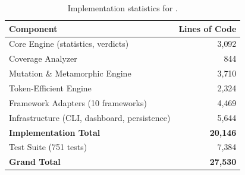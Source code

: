 \begin{table}[t]
\centering
\caption{Implementation statistics for \agentassay{}.}
\label{tab:impl-stats}
\small
\begin{tabular}{lr}
\toprule
\textbf{Component} & \textbf{Lines of Code} \\
\midrule
Core Engine (statistics, verdicts) & 3{,}092 \\
Coverage Analyzer & 844 \\
Mutation \& Metamorphic Engine & 3{,}710 \\
Token-Efficient Engine & 2{,}324 \\
Framework Adapters (10 frameworks) & 4{,}469 \\
Infrastructure (CLI, dashboard, persistence) & 5{,}644 \\
\midrule
\textbf{Implementation Total} & \textbf{20{,}146} \\
Test Suite (751 tests) & 7{,}384 \\
\midrule
\textbf{Grand Total} & \textbf{27{,}530} \\
\bottomrule
\end{tabular}
\end{table}
